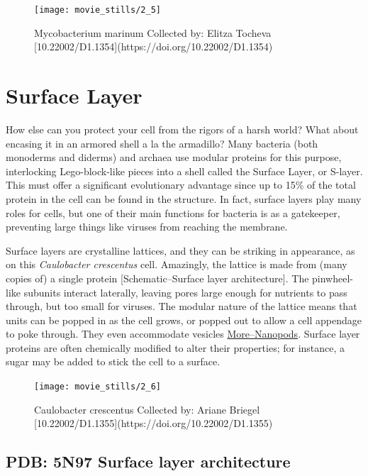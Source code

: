 \documentclass[]{tufte-book}
\begin{document}
\begin{figure}
\texttt{[image: movie\_stills/2\_5]} \caption[Mycobacterium marinum Collected by]{Mycobacterium marinum Collected by: Elitza Tocheva [10.22002/D1.1354](https://doi.org/10.22002/D1.1354)}\label{fig:unnamed-chunk-33}
\end{figure}

\section{Surface Layer}\label{surface-layer}

How else can you protect your cell from the rigors of a harsh world?
What about encasing it in an armored shell a la the armadillo? Many
bacteria (both monoderms and diderms) and archaea use modular proteins
for this purpose, interlocking Lego-block-like pieces into a shell
called the Surface Layer, or S-layer. This must offer a significant
evolutionary advantage since up to 15\% of the total protein in the cell
can be found in the structure. In fact, surface layers play many roles
for cells, but one of their main functions for bacteria is as a
gatekeeper, preventing large things like viruses from reaching the
membrane.

Surface layers are crystalline lattices, and they can be striking in
appearance, as on this \emph{Caulobacter crescentus} cell. Amazingly,
the lattice is made from (many copies of) a single protein
{[}Schematic--Surface layer architecture{]}. The pinwheel-like subunits
interact laterally, leaving pores large enough for nutrients to pass
through, but too small for viruses. The modular nature of the lattice
means that units can be popped in as the cell grows, or popped out to
allow a cell appendage to poke through. They even accommodate vesicles
\protect\hyperlink{morenanopods}{More--Nanopods}. Surface layer proteins
are often chemically modified to alter their properties; for instance, a
sugar may be added to stick the cell to a surface.

\begin{figure}
\texttt{[image: movie\_stills/2\_6]} \caption[Caulobacter crescentus Collected by]{Caulobacter crescentus Collected by: Ariane Briegel [10.22002/D1.1355](https://doi.org/10.22002/D1.1355)}\label{fig:unnamed-chunk-34}
\end{figure}

\subsection{PDB: 5N97 Surface layer
architecture}\label{PDB:_5N97_Surface_layer_architecture}
\end{document}

